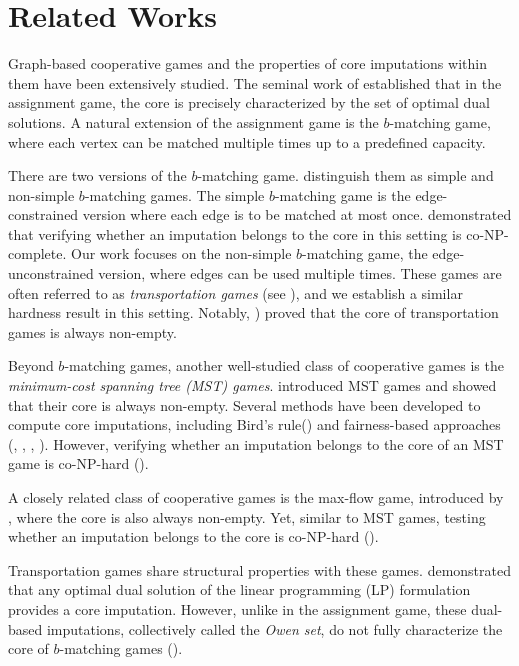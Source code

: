 \section{Related Works}


Graph-based cooperative games and the properties of core imputations within them have been extensively studied. The seminal work of \cite{Shapley1971assignment} established that in the assignment game, the core is precisely characterized by the set of optimal dual solutions. A natural extension of the assignment game is the $b$-matching game, where each vertex can be matched multiple times up to a predefined capacity.

There are two versions of the $b$-matching game. \cite{b_matching_nucleolus} distinguish them as simple and non-simple $b$-matching games. The simple $b$-matching game is the edge-constrained version where each edge is to be matched at most once. \cite{biro2018stable} demonstrated that verifying whether an imputation belongs to the core in this setting is co-NP-complete. Our work focuses on the non-simple $b$-matching game, the edge-unconstrained version, where edges can be used multiple times. These games are often referred to as \textit{transportation games} (see \cite{Transportation_games}), and we establish a similar hardness result in this setting. Notably, \cite{sotomayor1992multiple}) proved that the core of transportation games is always non-empty.

Beyond $b$-matching games, another well-studied class of cooperative games is the \textit{minimum-cost spanning tree (MST) games}. \cite{GranotHuberman1981} introduced MST games and showed that their core is always non-empty. Several methods have been developed to compute core imputations, including Bird’s rule(\cite{Bird1976}) and fairness-based approaches (\cite{Kar}, \cite{feltkamp1994irreducible}, \cite{bergantinos2007fair}, \cite{trudeau2012new}). However, verifying whether an imputation belongs to the core of an MST game is co-NP-hard (\cite{Faigle1997complexity}).

A closely related class of cooperative games is the max-flow game, introduced by \cite{Kalai1982totally}, where the core is also always non-empty. Yet, similar to MST games, testing whether an imputation belongs to the core is co-NP-hard (\cite{Fang2002computational}).

Transportation games share structural properties with these games. \cite{Transportation_games} demonstrated that any optimal dual solution of the linear programming (LP) formulation provides a core imputation. However, unlike in the assignment game, these dual-based imputations, collectively called the \textit{Owen set}, do not fully characterize the core of $b$-matching games (\cite{vazirani2023lpduality}).

